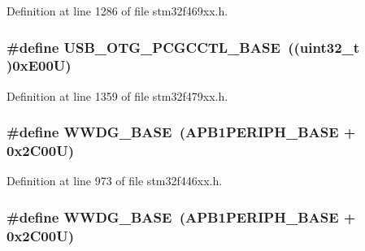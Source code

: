 Definition at line 1286 of file stm32f469xx.\+h.

\subsubsection[{\texorpdfstring{U\+S\+B\+\_\+\+O\+T\+G\+\_\+\+P\+C\+G\+C\+C\+T\+L\+\_\+\+B\+A\+SE}{USB_OTG_PCGCCTL_BASE}}]{\setlength{\rightskip}{0pt plus 5cm}\#define U\+S\+B\+\_\+\+O\+T\+G\+\_\+\+P\+C\+G\+C\+C\+T\+L\+\_\+\+B\+A\+SE~((uint32\+\_\+t )0x\+E00\+U)}\hypertarget{group___peripheral__memory__map_gaa9766975aca084c257730879568bc7cf}{}\label{group___peripheral__memory__map_gaa9766975aca084c257730879568bc7cf}


Definition at line 1359 of file stm32f479xx.\+h.

\subsubsection[{\texorpdfstring{W\+W\+D\+G\+\_\+\+B\+A\+SE}{WWDG_BASE}}]{\setlength{\rightskip}{0pt plus 5cm}\#define W\+W\+D\+G\+\_\+\+B\+A\+SE~({\bf A\+P\+B1\+P\+E\+R\+I\+P\+H\+\_\+\+B\+A\+SE} + 0x2\+C00\+U)}\hypertarget{group___peripheral__memory__map_ga9a5bf4728ab93dea5b569f5b972cbe62}{}\label{group___peripheral__memory__map_ga9a5bf4728ab93dea5b569f5b972cbe62}


Definition at line 973 of file stm32f446xx.\+h.

\subsubsection[{\texorpdfstring{W\+W\+D\+G\+\_\+\+B\+A\+SE}{WWDG_BASE}}]{\setlength{\rightskip}{0pt plus 5cm}\#define W\+W\+D\+G\+\_\+\+B\+A\+SE~({\bf A\+P\+B1\+P\+E\+R\+I\+P\+H\+\_\+\+B\+A\+SE} + 0x2\+C00\+U)}\hypertarget{group___peripheral__memory__map_ga9a5bf4728ab93dea5b569f5b972cbe62}{}\label{group___peripheral__memory__map_ga9a5bf4728ab93dea5b569f5b972cbe62}



